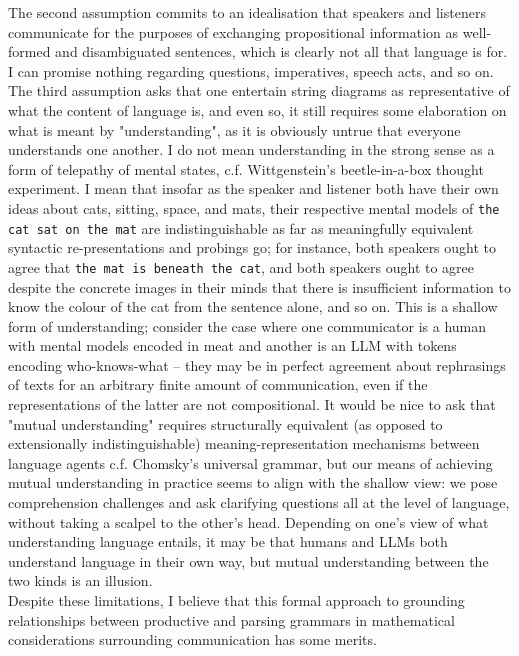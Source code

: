 The second assumption commits to an idealisation that speakers and listeners communicate for the purposes of exchanging propositional information as well-formed and disambiguated sentences, which is clearly not all that language is for. I can promise nothing regarding questions, imperatives, speech acts, and so on.\\

The third assumption asks that one entertain string diagrams as representative of what the content of language is, and even so, it still requires some elaboration on what is meant by "understanding", as it is obviously untrue that everyone understands one another. I do not mean understanding in the strong sense as a form of telepathy of mental states, c.f. Wittgenstein's beetle-in-a-box thought experiment. I mean that insofar as the speaker and listener both have their own ideas about cats, sitting, space, and mats, their respective mental models of \texttt{the cat sat on the mat} are indistinguishable as far as meaningfully equivalent syntactic re-presentations and probings go; for instance, both speakers ought to agree that \texttt{the mat is beneath the cat}, and both speakers ought to agree despite the concrete images in their minds that there is insufficient information to know the colour of the cat from the sentence alone, and so on. This is a shallow form of understanding; consider the case where one communicator is a human with mental models encoded in meat and another is an LLM with tokens encoding who-knows-what -- they may be in perfect agreement about rephrasings of texts for an arbitrary finite amount of communication, even if the representations of the latter are not compositional. It would be nice to ask that "mutual understanding" requires structurally equivalent (as opposed to extensionally indistinguishable) meaning-representation mechanisms between language agents c.f. Chomsky's universal grammar, but our means of achieving mutual understanding in practice seems to align with the shallow view: we pose comprehension challenges and ask clarifying questions all at the level of language, without taking a scalpel to the other's head. Depending on one's view of what understanding language entails, it may be that humans and LLMs both understand language in their own way, but mutual understanding between the two kinds is an illusion.\\

Despite these limitations, I believe that this formal approach to grounding relationships between productive and parsing grammars in mathematical considerations surrounding communication has some merits.

